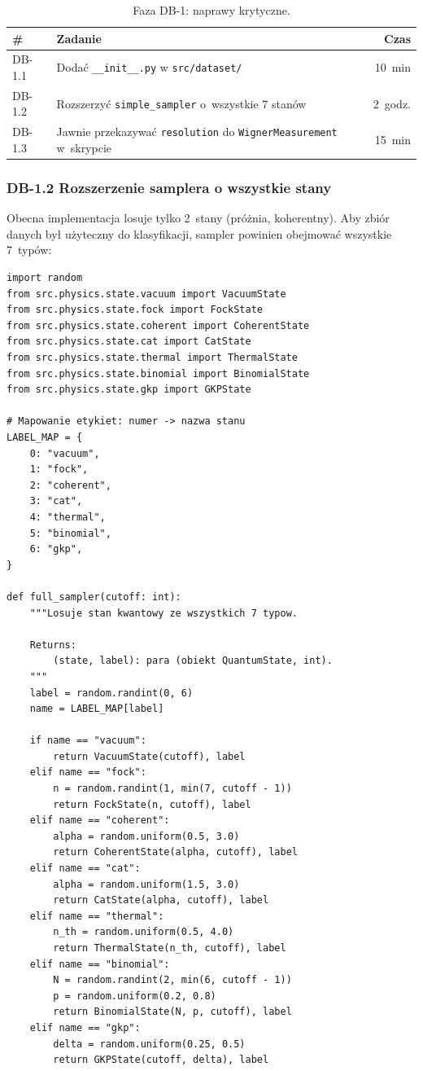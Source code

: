 \documentclass[12pt,a4paper]{article}
\begin{document}
\begin{table}[htbp]
\centering
\caption{Faza DB-1: naprawy krytyczne.}
\begin{tabular}{@{}lp{9cm}r@{}}
\toprule
\textbf{\#} & \textbf{Zadanie} & \textbf{Czas} \\
\midrule
DB-1.1 & Dodać \texttt{\_\_init\_\_.py} w \texttt{src/dataset/} & 10~min \\
DB-1.2 & Rozszerzyć \texttt{simple\_sampler} o~wszystkie 7 stanów & 2~godz. \\
DB-1.3 & Jawnie przekazywać \texttt{resolution} do \texttt{WignerMeasurement} w~skrypcie & 15~min \\
\bottomrule
\end{tabular}
\end{table}

\subsubsection{DB-1.2 Rozszerzenie samplera o wszystkie stany}

Obecna implementacja losuje tylko 2~stany (próżnia, koherentny). Aby zbiór danych był użyteczny do klasyfikacji, sampler powinien obejmować wszystkie 7~typów:

\begin{lstlisting}[caption={Proponowany rozszerzony sampler.}, label={lst:full-sampler}]
import random
from src.physics.state.vacuum import VacuumState
from src.physics.state.fock import FockState
from src.physics.state.coherent import CoherentState
from src.physics.state.cat import CatState
from src.physics.state.thermal import ThermalState
from src.physics.state.binomial import BinomialState
from src.physics.state.gkp import GKPState

# Mapowanie etykiet: numer -> nazwa stanu
LABEL_MAP = {
    0: "vacuum",
    1: "fock",
    2: "coherent",
    3: "cat",
    4: "thermal",
    5: "binomial",
    6: "gkp",
}

def full_sampler(cutoff: int):
    """Losuje stan kwantowy ze wszystkich 7 typow.

    Returns:
        (state, label): para (obiekt QuantumState, int).
    """
    label = random.randint(0, 6)
    name = LABEL_MAP[label]

    if name == "vacuum":
        return VacuumState(cutoff), label
    elif name == "fock":
        n = random.randint(1, min(7, cutoff - 1))
        return FockState(n, cutoff), label
    elif name == "coherent":
        alpha = random.uniform(0.5, 3.0)
        return CoherentState(alpha, cutoff), label
    elif name == "cat":
        alpha = random.uniform(1.5, 3.0)
        return CatState(alpha, cutoff), label
    elif name == "thermal":
        n_th = random.uniform(0.5, 4.0)
        return ThermalState(n_th, cutoff), label
    elif name == "binomial":
        N = random.randint(2, min(6, cutoff - 1))
        p = random.uniform(0.2, 0.8)
        return BinomialState(N, p, cutoff), label
    elif name == "gkp":
        delta = random.uniform(0.25, 0.5)
        return GKPState(cutoff, delta), label
\end{lstlisting}
\end{document}
